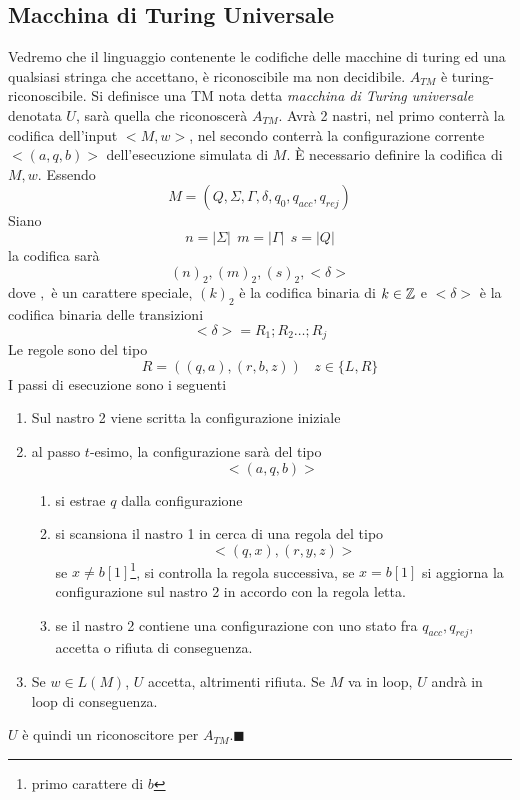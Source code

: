 \documentclass[10pt, letterpaper]{report}
\begin{document}
\subsection{Macchina di Turing Universale}
Vedremo che il linguaggio contenente le codifiche delle macchine di turing ed una qualsiasi stringa che accettano, è riconoscibile ma non decidibile.
\teo{} $A_{TM}$ è turing-riconoscibile.\acc 
\dimo{} Si definisce una TM nota detta \textit{macchina di Turing universale} denotata $U$, sarà quella che riconoscerà $A_{TM}$. Avrà 2 nastri, nel primo conterrà la codifica dell'input $<M,w>$, nel secondo conterrà la configurazione corrente $<(a,q,b)>$ dell'esecuzione simulata di $M$.\acc 
È necessario definire la codifica di $M,w$. Essendo 
$$ M=(Q,\Sigma,\Gamma,\delta,q_0,q_{acc},q_{rej})$$
Siano 
$$ n=|\Sigma| \ \ m=|\Gamma| \ \ s=|Q|$$
la codifica sarà 
$$ (n)_2,(m)_2,(s)_2,<\delta>$$
dove $,$ è un carattere speciale, $(k)_2$ è la codifica binaria di $k\in{\mathbb Z}$ e $<\delta>$ è la codifica binaria delle transizioni 
$$ <\delta>=R_1;R_2\dots;R_j$$
Le regole sono del tipo 
$$ R=((q,a),(r,b,z)) \ \ \ \ z\in\{L,R\}$$
I passi di esecuzione sono i seguenti\begin{enumerate}
    \item Sul nastro 2 viene scritta la configurazione iniziale 
    \item al passo $t$-esimo, la configurazione sarà del tipo $$ <(a,q,b)>$$\begin{enumerate}
        \item si estrae $q$ dalla configurazione 
        \item si scansiona il nastro 1 in cerca di una regola del tipo $$ <(q,x),(r,y,z)>$$
        se $x\ne b[1]$\footnote{primo carattere di $b$}, si controlla la regola successiva, se $x=b[1]$
        si aggiorna la configurazione sul nastro 2 in accordo con la regola letta. 
        \item se il nastro 2 contiene una configurazione con uno stato fra $q_{acc},q_{rej}$, accetta o rifiuta di conseguenza. 
    \end{enumerate}
    \item Se $w\in L(M)$, $U$ accetta, altrimenti rifiuta. Se $M$ va in loop, $U$ andrà in loop di conseguenza. 
\end{enumerate}
$U$ è quindi un riconoscitore per $A_{TM}$.\hfill$\blacksquare$\acc 
\end{document}
